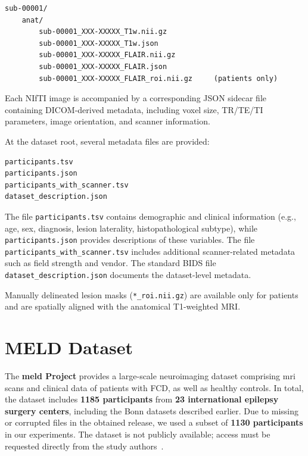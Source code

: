 \documentclass[FCD_GNN.tex]{subfiles}
\begin{document}
\begin{verbatim}
sub-00001/
    anat/
        sub-00001_XXX-XXXXX_T1w.nii.gz
        sub-00001_XXX-XXXXX_T1w.json
        sub-00001_XXX-XXXXX_FLAIR.nii.gz
        sub-00001_XXX-XXXXX_FLAIR.json
        sub-00001_XXX-XXXXX_FLAIR_roi.nii.gz     (patients only)
\end{verbatim}

Each NIfTI image is accompanied by a corresponding JSON sidecar file containing 
DICOM-derived metadata, including voxel size, TR/TE/TI parameters, image 
orientation, and scanner information.

At the dataset root, several metadata files are provided:

\begin{verbatim}
participants.tsv
participants.json
participants_with_scanner.tsv
dataset_description.json
\end{verbatim}

The file \texttt{participants.tsv} contains demographic and clinical information 
(e.g., age, sex, diagnosis, lesion laterality, histopathological subtype), 
while \texttt{participants.json} provides descriptions of these variables. 
The file \texttt{participants\_with\_scanner.tsv} includes additional scanner-related 
metadata such as field strength and vendor. 
The standard BIDS file \\ \texttt{dataset\_description.json} documents the dataset-level 
metadata.

Manually delineated lesion masks (\texttt{*\_roi.nii.gz}) are available only for 
patients and are spatially aligned with the anatomical T1-weighted MRI.

\section{MELD Dataset}
The \textbf{\ac{meld} Project} provides a large-scale neuroimaging dataset comprising \ac{mri} scans 
and clinical data of patients with FCD, as well as healthy controls. 
In total, the dataset includes \textbf{1185 participants} from \textbf{23 international epilepsy 
surgery centers}, including the Bonn datasets described earlier. 
Due to missing or corrupted files in the obtained release, we used a subset of 
\textbf{1130 participants} in our experiments. 
The dataset is not publicly available; access must be requested directly from the study authors~\cite{Ripart2025MELD}.
\end{document}
